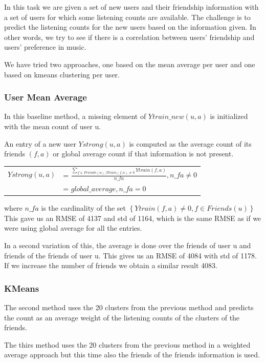 In this task we are given a set of new users and their friendship information with a set of users
for which some listening counts are available. The challenge is to predict the listening counts for the new users based on the information given. In other words, we try to see if there is a correlation between
users' friendship and users' preference in music.

We have tried two approaches, one based on the mean average per user and one based on kmeans clustering per user.

\subsubsection{User Mean Average}
In this baseline method, a missing element of $Ytrain\_new(u,a)$ is initialized with the mean count
of user u. 

An entry of a new user $Ystrong(u,a)$ is computed as the average count of its friends $(f,a)$ or global average count if that information is not present.

\begin{table}[h]
  \centering
  \begin{tabular}{ c  l }
  $Ystrong(u,a) $&= $\frac{\sum_{f\in Friends(u), Ytrain(f,a)\neq0}{Ytrain(f,a)}}{n\_fa}, n\_fa \neq 0$ \\ 
                          &= $global\_average, n\_fa = 0$ \\ 
  \end{tabular}
\end{table}
where $n\_fa$ is the cardinality of the set $\left\{ Ytrain(f,a)\neq0, f\in Friends(u)\right\}$
This gave us an RMSE of 4137  and std of 1164, which is the same RMSE as if we were using global average for all the entries.

In a second variation of this, the average is done over the friends of user u and friends of the friends of user u.
This gives us an RMSE of  4084 with std of 1178. If we increase the number of friends we obtain a similar result 4083.
\subsubsection{KMeans}

The second method uses the 20 clusters from the previous method and predicts the count
as an average weight of the listening counts of the clusters of the friends.

The thirs method uses the 20 clusters from the previous method in a weighted average approach but this time also the friends of the friends information is used. 


